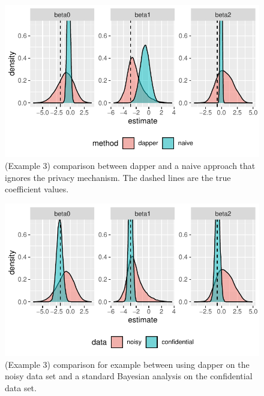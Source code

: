 \begin{figure}

{\centering \includegraphics{dppaper_files/figure-latex/regression-compare-1} 

}

\caption{(Example 3) comparison between dapper and a naive approach that ignores the privacy mechanism. 
The dashed lines are the true coefficient values.}\label{fig:regression-compare}
\end{figure}

\begin{figure}

{\centering \includegraphics{dppaper_files/figure-latex/regression-data-compare-1} 

}

\caption{(Example 3) comparison for example between using dapper on the noisy data set and a standard
Bayesian analysis on the confidential data set.}\label{fig:regression-data-compare}
\end{figure}

